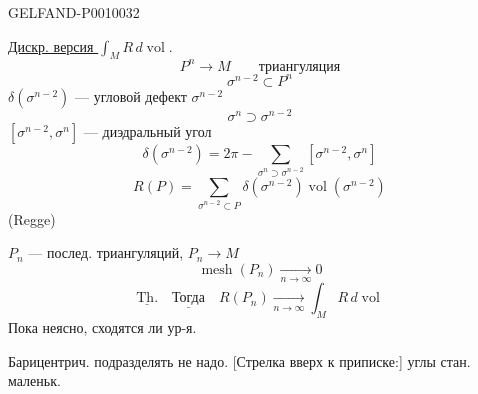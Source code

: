 \begin{GelfandAdjacentEvidence}{GELFAND-P001003}{2}


\underline{Дискр. версия $\displaystyle\int_M R\,d\operatorname{vol}$}.
\begin{equation*}
P^n\longrightarrow M\qquad\text{триангуляция}
\tag{12}
\end{equation*}
\[
\sigma^{n-2}\subset P^n
\]
$\delta(\sigma^{n-2})$ --- угловой дефект $\sigma^{n-2}$
\[
\sigma^n\supset\sigma^{n-2}
\]
$[\sigma^{n-2},\sigma^n]$ --- диэдральный угол
\begin{equation*}
\delta(\sigma^{n-2})=2\pi-\sum_{\sigma^n\supset\sigma^{n-2}}[\sigma^{n-2},\sigma^n]
\tag{13}
\end{equation*}
\begin{equation*}
R(P)=\sum_{\sigma^{n-2}\subset P}\delta(\sigma^{n-2})\operatorname{vol}(\sigma^{n-2})
\tag{14}
\end{equation*}
(Regge)

$P_n$ --- послед. триангуляций, $P_n\to M$
\begin{equation*}
\operatorname{mesh}(P_n)\underset{n\to\infty}{\longrightarrow}0
\tag{15}
\end{equation*}
\begin{equation*}
\underline{\text{Th.}}\quad\underline{\text{Тогда}}\quad
R(P_n)\underset{n\to\infty}{\longrightarrow}\int_M R\,d\operatorname{vol}
\tag{16}
\end{equation*}
Пока неясно, сходятся ли ур-я.

Барицентрич. подразделять не надо.
[Стрелка вверх к приписке:] углы стан. маленьк.
\end{GelfandAdjacentEvidence}

